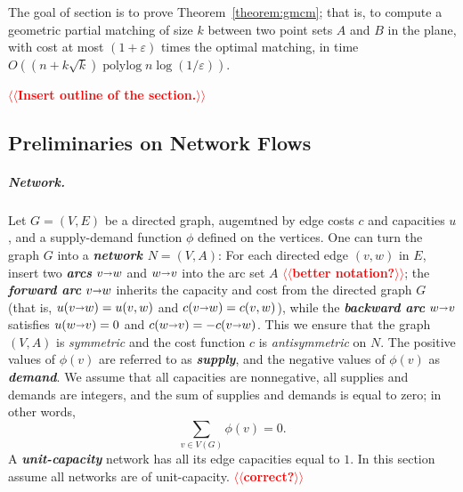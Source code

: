 \documentclass[a4paper,UKenglish]{socg-lipics-v2018}
\makeatletter
\def\note#1{\textcolor{red}{{#1}}}
\def\polylog{\mathop{\mathrm{polylog}}}
\def\eps{\varepsilon}
\def\fsupply{\phi}
\def\arcto{\mathord\shortrightarrow}
\def\arc#1#2{#1\arcto#2}
\theoremstyle{plain}
\numberwithin{figure}{section}
\renewcommand{\paragraph}{\subparagraph}
\def\EMPH#1{\textbf{\emph{\boldmath #1}}}
\def\n@te#1{\textsf{\boldmath \textbf{$\langle\!\langle$#1$\rangle\!\rangle$}}\leavevmode}
\def\note#1{\textcolor{red}{\n@te{#1}}}
\makeatother
\begin{document}
The goal of section is to prove Theorem~\ref{theorem:gmcm}; that is, to compute a geometric partial matching of size $k$ between two point sets $A$ and $B$ in the plane, with cost at most $(1+\eps)$ times the optimal matching, in time $O((n + k\sqrt{k})\polylog n \log(1/\eps))$.
%

\note{Insert outline of the section.}

\subsection{Preliminaries on Network Flows}

\paragraph{Network.}
Let $G=(V,E)$ be a directed graph, augemtned by edge costs $c$ and capacities $u$, and a supply-demand function $\fsupply$ defined on the vertices.
%
One can turn the graph $G$ into a \EMPH{network $N = (V, A)$}:
For each directed edge $(v,w)$ in $E$, insert two \EMPH{arcs} $\arc vw$ and $\arc wv$ into the arc set $A$ \note{better notation?}; the \EMPH{forward arc} $\arc vw$ inherits the capacity and cost from the directed graph $G$ (that is, $u(\arc vw) = u(v,w)$ and $c(\arc vw) = c(v,w)$), while the \EMPH{backward arc} $\arc wv$ satisfies $u(\arc wv) = 0$ and $c(\arc wv) = -c(\arc vw)$.  This we ensure that the graph $(V,A)$ is \emph{symmetric} and the cost function $c$ is \emph{antisymmetric} on $N$.
%
The positive values of $\fsupply(v)$ are referred to as \EMPH{supply}, and the negative values of $\fsupply(v)$ as \EMPH{demand}.
We assume that all capacities are nonnegative, all supplies and demands are integers, and the sum of supplies and demands is equal to zero; in other words,
\[
\sum_{v \in V(G)} \fsupply(v) = 0.
\]
%
A \EMPH{unit-capacity} network has all its edge capacities equal to $1$.
In this section assume all networks are of unit-capacity. \note{correct?}
\end{document}
